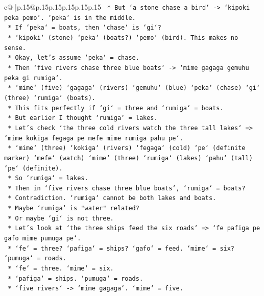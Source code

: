 \documentclass{article}
\begin{document}
{\begin{supertabular}{c@{$\;$}|p{.15\linewidth}@{}p{.15\linewidth}p{.15\linewidth}p{.15\linewidth}p{.15\linewidth}p{.15\linewidth}}
{{{\texttt{            *   But `a stone chase a bird` {-}> `kipoki peka pemo`. `peka` is in the middle.} \\
\texttt{            *   If `peka` = boats, then `chase` is `gi`?} \\
\texttt{            *   `kipoki` (stone) `peka` (boats?) `pemo` (bird). This makes no sense.} \\
\texttt{            *   Okay, let's assume `peka` = chase.} \\
\texttt{            *   Then `five rivers chase three blue boats` {-}> `mime gagaga gemuhu peka gi rumiga`.} \\
\texttt{            *   `mime` (five) `gagaga` (rivers) `gemuhu` (blue) `peka` (chase) `gi` (three) `rumiga` (boats).} \\
\texttt{            *   This fits perfectly if `gi` = three and `rumiga` = boats.} \\
\texttt{            *   But earlier I thought `rumiga` = lakes.} \\
\texttt{            *   Let's check `the three cold rivers watch the three tall lakes` => `mime kokiga fegaga pe mefe mime rumiga pahu pe`.} \\
\texttt{            *   `mime` (three) `kokiga` (rivers) `fegaga` (cold) `pe` (definite marker) `mefe` (watch) `mime` (three) `rumiga` (lakes) `pahu` (tall) `pe` (definite).} \\
\texttt{            *   So `rumiga` = lakes.} \\
\texttt{            *   Then in `five rivers chase three blue boats`, `rumiga` = boats?} \\
\texttt{            *   Contradiction. `rumiga` cannot be both lakes and boats.} \\
\texttt{            *   Maybe `rumiga` is "water" related?} \\
\texttt{            *   Or maybe `gi` is not three.} \\
\texttt{            *   Let's look at `the three ships feed the six roads` => `fe pafiga pe gafo mime pumuga pe`.} \\
\texttt{            *   `fe` = three? `pafiga` = ships? `gafo` = feed. `mime` = six? `pumuga` = roads.} \\
\texttt{            *   `fe` = three. `mime` = six.} \\
\texttt{            *   `pafiga` = ships. `pumuga` = roads.} \\
\texttt{            *   `five rivers` {-}> `mime gagaga`. `mime` = five.} \\
}}}
\end{supertabular}}
\end{document}
